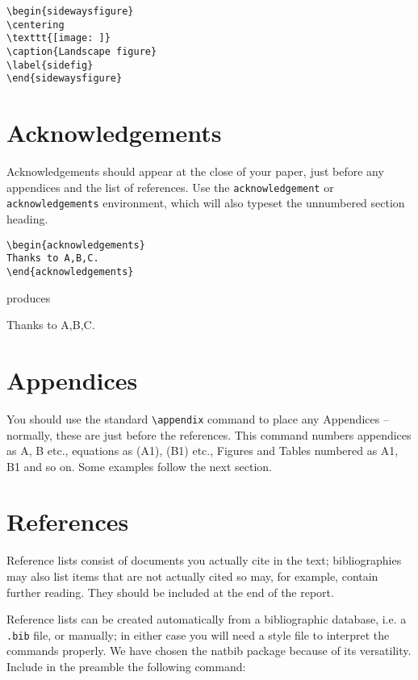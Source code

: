 \documentclass{MIIR}
\theoremstyle{plain}
\theoremstyle{definition}
\begin{document}
\begin{verbatim}
\begin{sidewaysfigure}
\centering
\texttt{[image: ]}
\caption{Landscape figure}
\label{sidefig}
\end{sidewaysfigure}
\end{verbatim}

\section{Acknowledgements}

Acknowledgements should appear at the close of your paper, just before
any appendices and the list of references. Use the \verb"acknowledgement"
or \verb"acknowledgements" environment, which will also typeset the
unnumbered section heading.
\begin{verbatim}
\begin{acknowledgements}
Thanks to A,B,C.
\end{acknowledgements}
\end{verbatim}
produces

\begin{acknowledgements}
Thanks to A,B,C.
\end{acknowledgements}




\section{Appendices}

You should use the standard  \verb"\appendix" command to place any
Appendices -- normally, these are just before the references. This command numbers
appendices as A, B etc., equations as (A1), (B1) etc., Figures and
Tables numbered as A1, B1 and so on. Some examples follow the next section.

\section{References}\label{refs}

Reference lists consist of documents you actually cite in the text; bibliographies
may also list items that are not actually cited so may, for example, contain further reading.
They should be included at the end of the report.

Reference lists can
be created automatically from a bibliographic database, i.e. a \verb".bib" file, or manually; in either case
you will need a style file to interpret the commands properly.
We have chosen the natbib package because of its versatility. Include in the preamble the following command:
\end{document}
